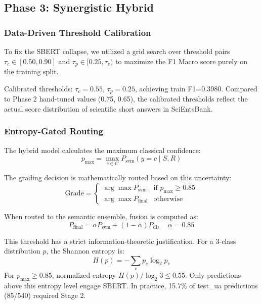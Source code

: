 \documentclass[conference]{IEEEtran}
\begin{document}
\subsection{Phase 3: Synergistic Hybrid}

\subsubsection{Data-Driven Threshold Calibration}
To fix the SBERT collapse, we utilized a grid search over threshold pairs $\tau_c \in [0.50, 0.90]$ and $\tau_p \in [0.25, \tau_c)$ to maximize the F1 Macro score purely on the training split.

Calibrated thresholds: $\tau_c=0.55$, $\tau_p=0.25$, achieving train F1=0.3980. Compared to Phase 2 hand-tuned values (0.75, 0.65), the calibrated thresholds reflect the actual score distribution of scientific short answers in SciEntsBank.

\subsubsection{Entropy-Gated Routing}
The hybrid model calculates the maximum classical confidence:
\begin{equation}
p_{\max} = \max_{c \in C} P_{\text{svm}}(y=c \mid S,R)
\end{equation}

The grading decision is mathematically routed based on this uncertainty:
\begin{equation}
\text{Grade} = \begin{cases}
\arg\max P_{\text{svm}} & \text{if } p_{\max} \geq 0.85 \\
\arg\max P_{\text{final}} & \text{otherwise}
\end{cases}
\end{equation}

When routed to the semantic ensemble, fusion is computed as:
\begin{equation}
P_{\text{final}} = \alpha P_{\text{svm}} + (1-\alpha) P_{\text{dl}},\quad \alpha=0.85
\end{equation}

This threshold has a strict information-theoretic justification. For a 3-class distribution $p$, the Shannon entropy is:
\begin{equation}
H(p) = -\sum_{c} p_c \log_2 p_c
\end{equation}
For $p_{\max} \geq 0.85$, normalized entropy $H(p)/\log_2 3 \leq 0.55$. Only predictions above this entropy level engage SBERT. In practice, 15.7\% of test\_ua predictions (85/540) required Stage 2.
\end{document}
